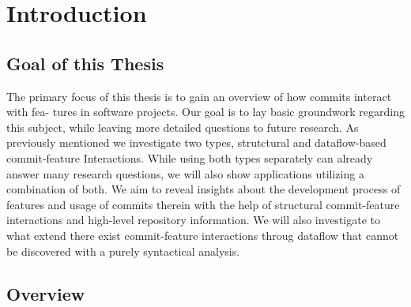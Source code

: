 \section*{Introduction}\label{ch:introduction}

\subsection*{Goal of this Thesis}

The primary focus of this thesis is to gain an overview of how commits interact with fea-
tures in software projects. Our goal is to lay basic groundwork regarding this
subject, while leaving more detailed questions to future research. As previously mentioned
we investigate two types, strutctural and dataflow-based commit-feature Interactions. While
using both types separately can already answer many research questions, we will also show
applications utilizing a combination of both.
We aim to reveal insights about the development process of features and usage of commits therein 
with the help of structural commit-feature interactions and high-level repository information.
We will also investigate to what extend there exist commit-feature interactions
throug dataflow that cannot be discovered with a purely syntactical analysis.

\subsection*{Overview}

